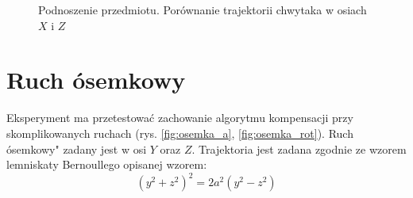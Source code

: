 \begin{figure}[H]
	\centering
	\hfill
	\caption{Podnoszenie przedmiotu. Porównanie trajektorii chwytaka w osiach $X$ i $Z$}
	\label{fig:podn_porow_przedm_bok}
\end{figure}





\section{Ruch ósemkowy}
Eksperyment ma przetestować zachowanie algorytmu kompensacji przy skomplikowanych ruchach (rys. \ref{fig:osemka_a}, \ref{fig:osemka_rot}).  Ruch ósemkowy" zadany jest w osi $Y$ oraz $Z$.
Trajektoria jest zadana zgodnie ze wzorem lemniskaty Bernoullego opisanej wzorem:
\begin{equation}
(y^2 + z^2)^2 = 2a^2(y^2-z^2)
\end{equation}

